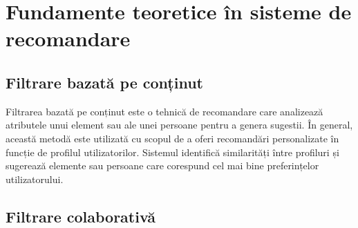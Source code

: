 \chapter{Fundamente teoretice în sisteme de recomandare}
\label{chap:ch3}

\section{Filtrare bazată pe conținut}
\label{sec:ch3sec1}

Filtrarea bazată pe conținut este o tehnică de recomandare care analizează atributele unui element sau ale unei persoane pentru a genera sugestii.
În general, această metodă este utilizată cu scopul de a oferi recomandări personalizate în funcție de profilul utilizatorilor.
Sistemul identifică similarități între profiluri și sugerează elemente sau persoane care corespund cel mai bine preferințelor utilizatorului.
\cite{kumar2018recommendation}

\subsection{}

\section{Filtrare colaborativă}
\label{sec:ch3sec2}
